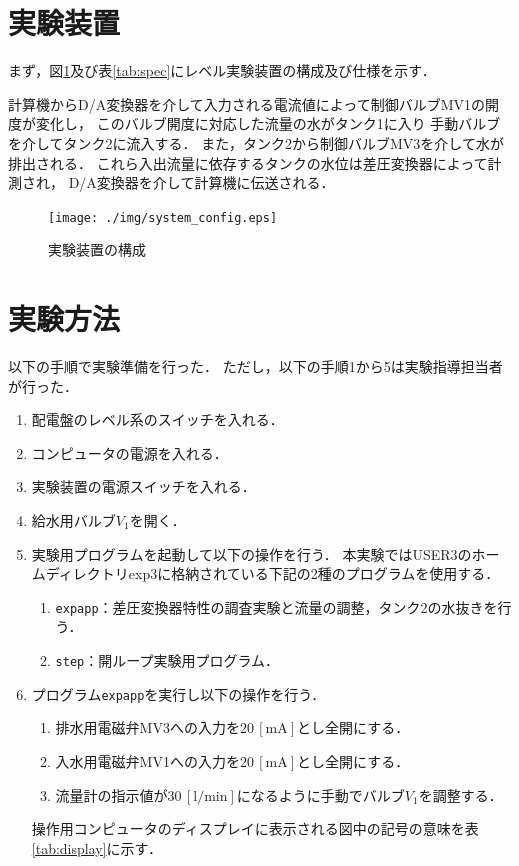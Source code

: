 \documentclass[11pt,a4paper]{jsarticle}
\begin{document}
\newpage

\section{実験装置}
まず，図\ref{fig:config}及び表\ref{tab:spec}にレベル実験装置の構成及び仕様を示す．

計算機からD/A変換器を介して入力される電流値によって制御バルブMV1の開度が変化し，
このバルブ開度に対応した流量の水がタンク1に入り
手動バルブを介してタンク2に流入する．
また，タンク2から制御バルブMV3を介して水が排出される．
これら入出流量に依存するタンクの水位は差圧変換器によって計測され，
D/A変換器を介して計算機に伝送される．\\

\begin{figure}[b]
  \begin{center}
    \texttt{[image: ./img/system\_config.eps]}
  \end{center}
  \caption{実験装置の構成}
  \label{fig:config}
\end{figure}

 \section{実験方法}
以下の手順で実験準備を行った．
ただし，以下の手順1から5は実験指導担当者が行った．
\begin{enumerate}
  \item 配電盤のレベル系のスイッチを入れる．
  \item コンピュータの電源を入れる．
  \item 実験装置の電源スイッチを入れる．
  \item 給水用バルブ$V_1$を開く．
  \item 実験用プログラムを起動して以下の操作を行う．
        本実験ではUSER3のホームディレクトリexp3に格納されている下記の2種のプログラムを使用する．
    \begin{enumerate}
      \setlength{\leftskip}{5mm}
      \item \texttt{expapp}：差圧変換器特性の調査実験と流量の調整，タンク2の水抜きを行う．
      \item \texttt{step}：開ループ実験用プログラム．
    \end{enumerate}
  \item プログラム\texttt{expapp}を実行し以下の操作を行う．
    \begin{enumerate}
      \setlength{\leftskip}{5mm}
      \item 排水用電磁弁MV3への入力を$20 \, \mathrm{[mA]}$とし全開にする．
      \item 入水用電磁弁MV1への入力を$20 \, \mathrm{[mA]}$とし全開にする．
      \item 流量計の指示値が$30 \, \mathrm{[l/min]}$になるように手動でバルブ$V_1$を調整する．
    \end{enumerate}
    操作用コンピュータのディスプレイに表示される図中の記号の意味を表\ref{tab:display}に示す．
\end{enumerate}
\end{document}

